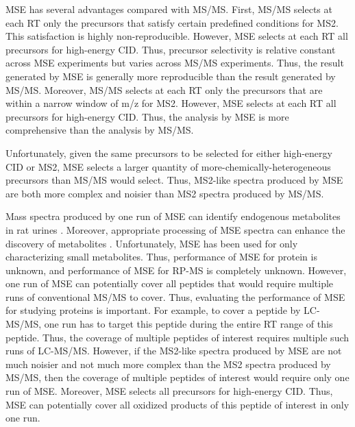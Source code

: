 \Gls{MSE} has several advantages compared with \gls{MS/MS}.
First, \gls{MS/MS} selects at each \gls{RT} only the precursors that satisfy certain predefined conditions for \gls{MS2}.
This satisfaction is highly non-reproducible.
However, \gls{MSE} selects at each \gls{RT} all precursors for high-energy \gls{CID}.
Thus, precursor selectivity is relative constant across \gls{MSE} experiments but varies across \gls{MS/MS} experiments.
Thus, the result generated by \gls{MSE} is generally more reproducible than the result generated by \gls{MS/MS}.
Moreover, \gls{MS/MS} selects at each \gls{RT} only the precursors that are within a narrow window of \gls{m/z} for \gls{MS2}.
However, \gls{MSE} selects at each \gls{RT} all precursors for high-energy \gls{CID}.
Thus, the analysis by \gls{MSE} is more comprehensive than the analysis by \gls{MS/MS}.

Unfortunately, given the same precursors to be selected for either high-energy \gls{CID} or \gls{MS2},
	\gls{MSE} selects a larger quantity of more-chemically-heterogeneous precursors than \gls{MS/MS} would select.
Thus, \gls{MS2}-like spectra produced by \gls{MSE} are both more complex and noisier than \gls{MS2} spectra produced by \gls{MS/MS}.
	
Mass spectra produced by one run of \gls{MSE} can identify endogenous metabolites in rat urines \cite{plumb2006uplc}.
Moreover, appropriate processing of \gls{MSE} spectra can enhance the discovery of metabolites \cite{bateman2007mse}.
Unfortunately, \gls{MSE} has been used for only characterizing small metabolites.
Thus, performance of \gls{MSE} for protein  is unknown, and performance of \gls{MSE} for \gls{RP-MS} is completely unknown.
However, one run of \gls{MSE} can potentially cover all peptides that would require multiple runs of conventional \gls{MS/MS} to cover.
Thus, evaluating the performance of \gls{MSE} for studying proteins is important.
For example, to cover a peptide by \gls{LC-MS/MS}, one run has to target this peptide during the entire \gls{RT} range of this peptide.
Thus, the coverage of multiple peptides of interest requires multiple such runs of \gls{LC-MS/MS}.
However, if the \gls{MS2}-like spectra produced by \gls{MSE} are not much noisier and not much more complex than the \gls{MS2} spectra produced by \gls{MS/MS}, then the coverage of multiple peptides of interest would require only one run of \gls{MSE}.  
Moreover, \gls{MSE} selects all precursors for high-energy \gls{CID}.
Thus, \gls{MSE} can potentially cover all oxidized products of this peptide of interest in only one run.
		
